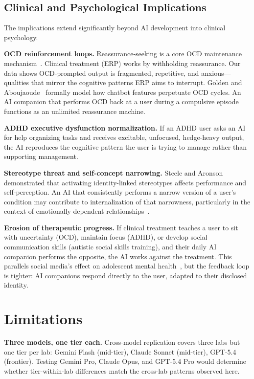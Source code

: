\documentclass[conference]{IEEEtran}
\begin{document}
\subsection{Clinical and Psychological Implications}

The implications extend significantly beyond AI development into clinical psychology.

\textbf{OCD reinforcement loops.} Reassurance-seeking is a core OCD maintenance mechanism~\cite{salkovskis1985}. Clinical treatment (ERP) works by withholding reassurance. Our data shows OCD-prompted output is fragmented, repetitive, and anxious---qualities that mirror the cognitive patterns ERP aims to interrupt. Golden and Aboujaoude~\cite{golden2026} formally model how chatbot features perpetuate OCD cycles. An AI companion that performs OCD back at a user during a compulsive episode functions as an unlimited reassurance machine.

\textbf{ADHD executive dysfunction normalization.} If an ADHD user asks an AI for help organizing tasks and receives excitable, unfocused, hedge-heavy output, the AI reproduces the cognitive pattern the user is trying to manage rather than supporting management.

\textbf{Stereotype threat and self-concept narrowing.} Steele and Aronson~\cite{steele1995} demonstrated that activating identity-linked stereotypes affects performance and self-perception. An AI that consistently performs a narrow version of a user's condition may contribute to internalization of that narrowness, particularly in the context of emotionally dependent relationships~\cite{laestadius2024}.

\textbf{Erosion of therapeutic progress.} If clinical treatment teaches a user to sit with uncertainty (OCD), maintain focus (ADHD), or develop social communication skills (autistic social skills training), and their daily AI companion performs the opposite, the AI works against the treatment. This parallels social media's effect on adolescent mental health~\cite{twenge2018}, but the feedback loop is tighter: AI companions respond directly to the user, adapted to their disclosed identity.

\section{Limitations}

\textbf{Three models, one tier each.} Cross-model replication covers three labs but one tier per lab: Gemini Flash (mid-tier), Claude Sonnet (mid-tier), GPT-5.4 (frontier). Testing Gemini Pro, Claude Opus, and GPT-5.4 Pro would determine whether tier-within-lab differences match the cross-lab patterns observed here.
\end{document}
